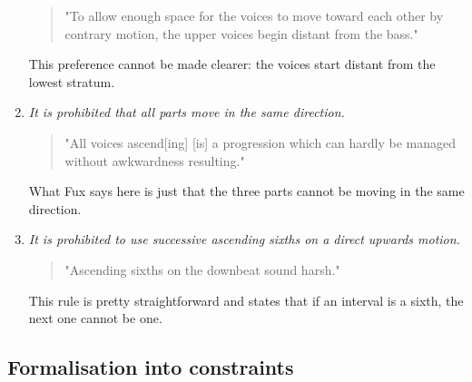 \begin{enumerate}[wide, label=\bfseries 1.P\arabic*]
    \begin{quotation}
    "To allow enough space for the voices to move toward each other by contrary motion, the upper voices begin distant from the bass."
    \textcite[p.75]{GaPEng}
    \end{quotation}

    This preference cannot be made clearer: the voices start distant from the lowest stratum.

    \item\label{rule:same-movement} \reddot \textit{It is prohibited that all parts move in the same direction.}

    \begin{quotation}
    "All voices ascend[ing] [is] a progression which can hardly be managed without awkwardness resulting."
    \textcite[p.76]{GaPEng}
    \end{quotation}

    What Fux says here is just that the three parts cannot be moving in the same direction. 

    \item\label{rule:ascending-sixths} \reddot \textit{It is prohibited to use successive ascending sixths on a direct upwards motion.}

    \begin{quotation}
    "Ascending sixths on the downbeat sound harsh."
    \textcite[p.77]{GaPEng}
    \end{quotation}

    This rule is pretty straightforward and states that if an interval is a sixth, the next one cannot be one.
\end{enumerate}

\subsection{Formalisation into constraints}
